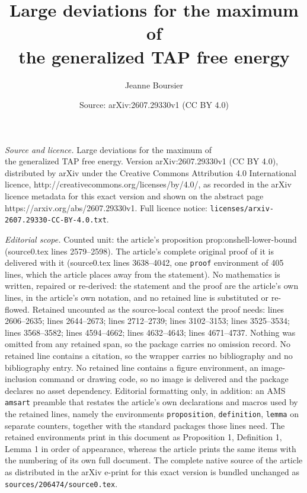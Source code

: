 \documentclass[10pt,a4paper]{amsart}
\title{Large deviations for the maximum of\\ the generalized TAP free energy}
\author{Jeanne Boursier}
\date{Source: arXiv:2607.29330v1 (CC BY 4.0)}
\begin{document}
\maketitle

\noindent\emph{Source and licence.} Large deviations for the maximum of\\ the generalized TAP free energy. Version arXiv:2607.29330v1 (CC BY 4.0), distributed by arXiv under the Creative Commons Attribution 4.0 International licence, http://creativecommons.org/licenses/by/4.0/, as recorded in the arXiv licence metadata for this exact version and shown on the abstract page https://arxiv.org/abs/2607.29330v1. Full licence notice: \texttt{licenses/arxiv-2607.29330-CC-BY-4.0.txt}.\par\smallskip

\noindent\textit{Editorial scope.} Counted unit: the article's proposition prop:onshell-lower-bound (source0.tex lines 2579--2598). The article's complete original proof of it is delivered with it (source0.tex lines 3638--4042, one \texttt{proof} environment of 405 lines, which the article places away from the statement). No mathematics is written, repaired or re-derived: the statement and the proof are the article's own lines, in the article's own notation, and no retained line is substituted or re-flowed.  Retained uncounted as the source-local context the proof needs: lines 2606--2635; lines 2644--2673; lines 2712--2739; lines 3102--3153; lines 3525--3534; lines 3568--3582; lines 4594--4662; lines 4632--4643; lines 4671--4737.  Nothing was omitted from any retained span, so the package carries no omission record.  No retained line contains a citation, so the wrapper carries no bibliography and no bibliography entry.  No retained line contains a figure environment, an image-inclusion command or drawing code, so no image is delivered and the package declares no asset dependency.  Editorial formatting only, in addition: an AMS \texttt{amsart} preamble that restates the article's own declarations and macros used by the retained lines, namely the environments \texttt{proposition}, \texttt{definition}, \texttt{lemma} on separate counters, together with the standard packages those lines need.  The retained environments print in this document as Proposition 1, Definition 1, Lemma 1 in order of appearance, whereas the article prints the same items with the numbering of its own full document.  The complete native source of the article as distributed in the arXiv e-print for this exact version is bundled unchanged as \texttt{sources/206474/source0.tex}.
\end{document}
